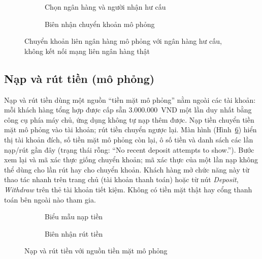 \begin{figure}[H]
\centering
\begin{subfigure}[t]{0.4\textwidth}
  \centering
  \caption{Chọn ngân hàng và người nhận hư cấu}
  \label{fig:ch4-interbank-form}
\end{subfigure}\hspace{0.05\textwidth}%
\begin{subfigure}[t]{0.4\textwidth}
  \centering
  \caption{Biên nhận chuyển khoản mô phỏng}
  \label{fig:ch4-interbank-receipt}
\end{subfigure}
\caption{Chuyển khoản liên ngân hàng mô phỏng với ngân hàng hư cấu, không kết nối mạng liên ngân hàng thật}
\label{fig:ch4-interbank}
\end{figure}

\subsection{Nạp và rút tiền (mô phỏng)}
\label{sec:ch4-cash}

Nạp và rút tiền dùng một nguồn ``tiền mặt mô phỏng'' nằm ngoài các tài khoản: mỗi khách hàng tổng hợp được cấp sẵn 3.000.000~VND một lần duy nhất bằng công cụ phía máy chủ, ứng dụng không tự nạp thêm được. Nạp tiền chuyển tiền mặt mô phỏng vào tài khoản; rút tiền chuyển ngược lại. Màn hình (Hình~\ref{fig:ch4-cash}) hiển thị tài khoản đích, số tiền mặt mô phỏng còn lại, ô số tiền và danh sách các lần nạp/rút gần đây (trạng thái rỗng: ``No recent deposit attempts to show.''). Bước xem lại và mã xác thực giống chuyển khoản; mã xác thực của một lần nạp không thể dùng cho lần rút hay cho chuyển khoản. Khách hàng mở chức năng này từ thao tác nhanh trên trang chủ (tài khoản thanh toán) hoặc từ nút \textit{Deposit}, \textit{Withdraw} trên thẻ tài khoản tiết kiệm. Không có tiền mặt thật hay cổng thanh toán bên ngoài nào tham gia.

\begin{figure}[H]
\centering
\begin{subfigure}[t]{0.4\textwidth}
  \centering
  \caption{Biểu mẫu nạp tiền}
  \label{fig:ch4-cash-deposit}
\end{subfigure}\hspace{0.05\textwidth}%
\begin{subfigure}[t]{0.4\textwidth}
  \centering
  \caption{Biên nhận rút tiền}
  \label{fig:ch4-cash-withdrawal}
\end{subfigure}
\caption{Nạp và rút tiền với nguồn tiền mặt mô phỏng}
\label{fig:ch4-cash}
\end{figure}

